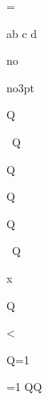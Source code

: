 
\output={  }
\def\reset{\noindent\par}
\def\sp{ } \def\spsp{\sp\sp}
\ignorespaces    \reset
\ignorespaces\sp\spsp\reset
\noindent a\ignorespaces   b\ignorespaces\sp\spsp c\ignorespaces\relax\ignorespaces{} d\showlists\par
\expandafter\ignorespaces\sp\reset
\pdfprimitive\relax\reset
\let\saverelax=\relax
\def\relax{no}\pdfprimitive\relax\reset \let\relax=\saverelax
\noindent\def\hskip{no}\pdfprimitive\hskip 3pt\showlists\par\let\hskip=\undefined
\noindent\pdfprimitive\vrule\showlists\par
\def\q{Q}\noindent\pdfprimitive\vrule\q\showlists\par
\noindent\pdfprimitive\ \q\showlists\par
\noindent\pdfprimitive\/\q\showlists\par
\noindent\pdfprimitive\-\q\showlists\par
\pdfprimitive\undefinedname\reset
\noindent\pdfprimitive\q\showlists\par
\noindent\pdfprimitive\undefinedname\showlists\par
\noindent\pdfprimitive~\q\showlists\par
\noindent\pdfprimitive x\showlists\par
\noindent\pdfprimitive{\q}\showlists\par
\noindent\pdfprimitive\pdfprimitive\vrule\q\showlists\par
\def\viapdfprimitive{\pdfprimitive}\noindent\expandafter\viapdfprimitive\vrule\showlists\par
{}<\pdfprimitive\lastpenalty\fi\reset
\afterassignment\q{}=1 \showlists\par
\afterassignment\relax{}=1
\begingroup\aftergroup\q\aftergroup\q\endgroup\showlists\par
{\aftergroup\relax}
\reset
\begingroup\aftergroup}\aftergroup{\endgroup}\reset
